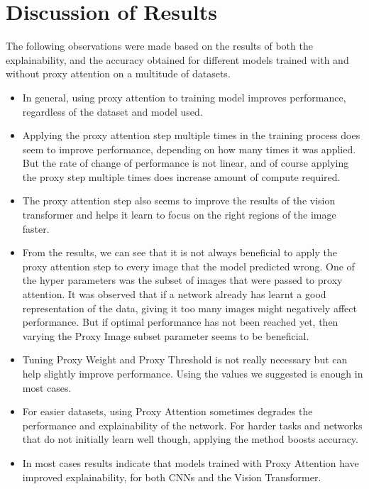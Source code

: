\section{Discussion of Results}
The following observations were made based on the results of both the explainability, and the accuracy obtained for different models trained with and without proxy attention on a multitude of datasets.
\begin{itemize}
 \item In general, using proxy attention to training model improves performance, regardless of the dataset and model used.
 \item Applying the proxy attention step multiple times in the training process does seem to improve performance, depending on how many times it was applied. But the rate of change of performance is not linear, and of course applying the proxy step multiple times does increase amount of compute required.
 \item The proxy attention step also seems to improve the results of the vision transformer and helps it learn to focus on the right regions of the image faster.
 \item From the results, we can see that it is not always beneficial to apply the proxy attention step to every image that the model predicted wrong. One of the hyper parameters was the subset of images that were passed to proxy attention. It was observed that if a network already has learnt a good representation of the data, giving it too many images might negatively affect performance. But if optimal performance has not been reached yet, then varying the Proxy Image subset parameter seems to be beneficial.
 \item Tuning Proxy Weight and Proxy Threshold is not really necessary but can help slightly improve performance. Using the values we suggested is enough in most cases.
 \item For easier datasets, using Proxy Attention sometimes degrades the performance and explainability of the network. For harder tasks and networks that do not initially learn well though, applying the method boosts accuracy.
 \item In most cases results indicate that models trained with Proxy Attention have improved explainability, for both CNNs and the Vision Transformer.
\end{itemize}



